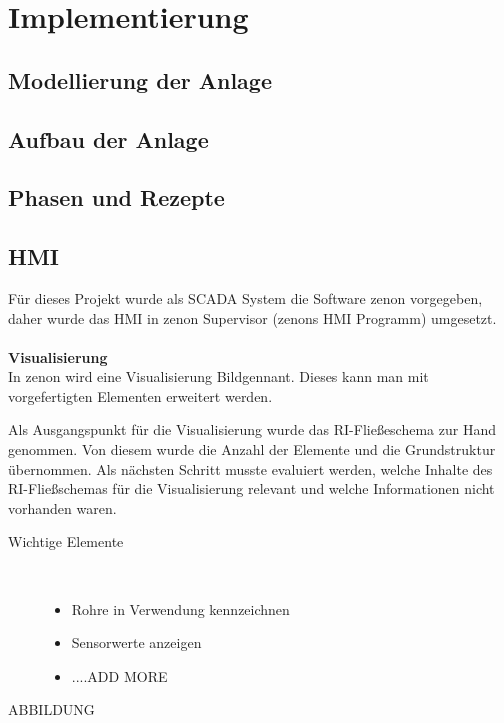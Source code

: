\chapter{Implementierung} \label{chapter:thevetestcase}
\section{Modellierung der Anlage}
\section{Aufbau der Anlage}
\section{Phasen und Rezepte}
\section{HMI}
Für dieses Projekt wurde als SCADA System die Software zenon vorgegeben, daher wurde das HMI in zenon Supervisor (zenons HMI Programm) umgesetzt.\\
\\
\textbf{Visualisierung}\\
In zenon wird eine Visualisierung  \glqq Bild\grqq\space  gennant. Dieses kann man mit vorgefertigten Elementen erweitert werden. 

Als Ausgangspunkt für die Visualisierung wurde das RI-Fließeschema zur Hand genommen. Von diesem wurde die Anzahl der Elemente und die Grundstruktur übernommen. Als nächsten Schritt musste evaluiert werden, welche Inhalte des RI-Fließschemas für die Visualisierung relevant und welche Informationen nicht vorhanden waren.
\begin{description}
\item[Wichtige Elemente]~\par
	\begin{itemize}
		\item Rohre in Verwendung kennzeichnen
		\item Sensorwerte anzeigen
		\item ....ADD MORE
	\end{itemize}
\end{description}
ABBILDUNG\\

